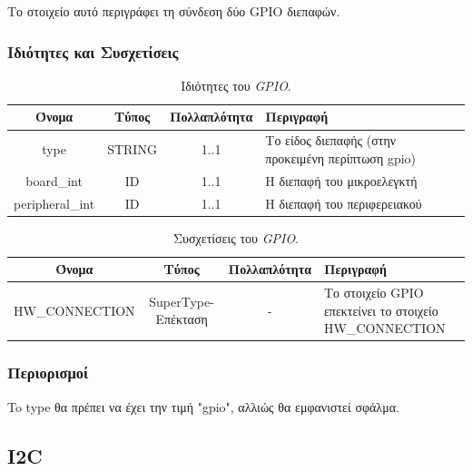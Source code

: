 \noindent Το στοιχείο αυτό περιγράφει τη σύνδεση δύο GPIO διεπαφών.

\subsubsection*{Ιδιότητες και Συσχετίσεις}

\begin{table}[H]
	\begin{center}
		\caption{Ιδιότητες του \textit{GPIO}.}
		\label{tab:gpio_con1}
		\begin{tabular}{ | c | c | c| m{5.5cm} | }
			\hline
			\rowcolor{Gray}
			Όνομα & Τύπος & Πολλαπλότητα & Περιγραφή \\
			\hline
			type & STRING & 1..1 & Το είδος διεπαφής (στην προκειμένη περίπτωση gpio) \\
			\hline
			board\_int & ID & 1..1 & Η διεπαφή του μικροελεγκτή \\
			\hline
			peripheral\_int & ID & 1..1 & Η διεπαφή του περιφερειακού \\
			\hline
		\end{tabular}
	\end{center}
\end{table}

\begin{table}[H]
	\begin{center}
		\caption{Συσχετίσεις του \textit{GPIO}.}
		\label{tab:gpio_con2}
		\begin{tabular}{ | c | c | c| m{5.5cm} | }
			\hline
			\rowcolor{Gray}
			Όνομα & Τύπος & Πολλαπλότητα & Περιγραφή \\
			\hline
			\footnotesize{HW\_CONNECTION} & SuperType-Επέκταση & - &  Το στοιχείο GPIO επεκτείνει το στοιχείο HW\_CONNECTION \\
			\hline
		\end{tabular}
	\end{center}
\end{table}

\subsubsection*{Περιορισμοί}

\noindent To type θα πρέπει να έχει την τιμή "gpio", αλλιώς θα εμφανιστεί σφάλμα.

\subsection{I2C}
\label{subsec:i2c_con}

